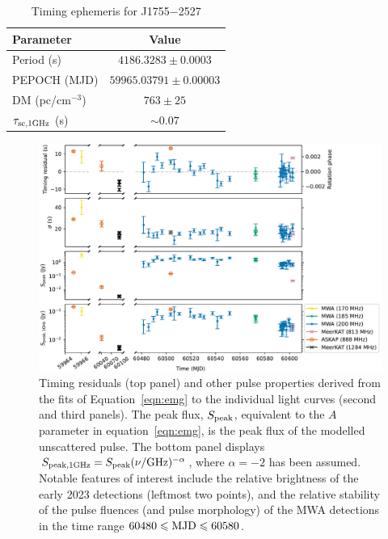 \documentclass[fleqn,usenatbib]{mnras}
\newcommand{\src}{J1755$-$2527}
\newcommand{\eqn}{equation}
\newcommand{\Eqn}{Equation}
\begin{document}
\begin{table}
  \centering
  \caption{Timing ephemeris for \src{}}
  \label{tbl:ephemeris}
  \begin{tabular}{lc}
    \hline
    Parameter & Value \\
    \hline
    Period (s) & $4186.3283 \pm 0.0003$ \\
    PEPOCH (MJD) & $59965.03791 \pm 0.00003$ \\
    DM (pc/cm$^{-3}$) & $763 \pm 25$ \\
    $\tau_{\rm sc,1 GHz}$ (s) & ${\sim}0.07$ \\
    \hline
  \end{tabular}
\end{table}

\begin{figure}
  \centering
  \includegraphics[width=0.98\linewidth]{pulse_details.pdf}
  \caption{Timing residuals (top panel) and other pulse properties derived from the fits of \Eqn~\ref{eqn:emg} to the individual light curves (second and third panels). The peak flux, $S_{\rm peak}$, equivalent to the $A$ parameter in \eqn~\ref{eqn:emg}, is the peak flux of the modelled unscattered pulse. The bottom panel displays $S_{\rm peak,1 GHz} = S_{\rm peak} (\nu/{\rm GHz})^{-\alpha}$, where $\alpha = -2$ has been assumed. Notable features of interest include the relative brightness of the early 2023 detections (leftmost two points), and the relative stability of the pulse fluences (and pulse morphology) of the MWA detections in the time range $60480 \le {\rm MJD} \le 60580$.}
  \label{fig:pulse_details}
\end{figure}
\end{document}
